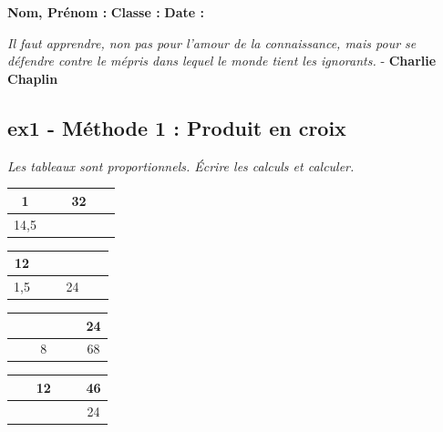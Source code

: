 \documentclass[11pt]{article}
\begin{document}
\newcommand{\Pointilles}[1][3]{%
  \multido{}{#1}{\makebox[\linewidth]{\dotfill}\\[\parskip]
}}

\setlength{\columnseprule}{1pt}

\textbf{Nom, Prénom :} \hspace{8cm} \textbf{Classe :} \hspace{3cm} \textbf{Date :}\\

\begin{center}
  \textit{Il faut apprendre, non pas pour l'amour de la connaissance, mais pour se défendre contre le mépris dans lequel le monde tient les ignorants.}  - \textbf{Charlie Chaplin}
\end{center}

\subsection*{ex1 - Méthode 1 : Produit en croix}
\textit{Les tableaux sont proportionnels. Écrire les calculs et calculer.}

  \begin{multicols}{4}\noindent
    \begin{center}
      \begin{tabular}{|c|c|}
        \hline
        1 & 32\\  \hline
        14,5 & $\phantom{azertyuiop}$\\  \hline
      \end{tabular}
    \end{center}
    \Pointilles[1]
    \begin{center}
      \begin{tabular}{|c|c|}
        \hline
        12 & $\phantom{azertyuiop}$\\  \hline
        1,5 & 24\\  \hline
      \end{tabular}
    \end{center}
    \Pointilles[1]
    \begin{center}
      \begin{tabular}{|c|c|}
        \hline
        $\phantom{azertyuiop}$  & 24\\  \hline
        8 & 68\\  \hline
      \end{tabular}
    \end{center}
    \Pointilles[1]
    \begin{center}
      \begin{tabular}{|c|c|}
        \hline
        12 & 46\\  \hline
        $\phantom{azertyuiop}$ & 24\\  \hline
      \end{tabular}
    \end{center}
    \Pointilles[1]
  \end{multicols}
\end{document}
